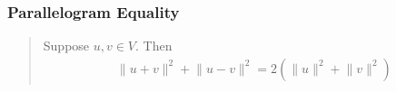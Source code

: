 \documentclass[letterpaper]{article}
\begin{document}
\subsubsection{Parallelogram Equality}
\label{sec:org3962bf4}
\begin{quote}
Suppose \(u, v \in V\). Then
\[\begin{aligned}
    \lVert u+v \rVert^2 + \lVert u-v \rVert^2 = 2(\lVert u \rVert^2 + \lVert v \rVert^2)
	\end{aligned}\]
\end{quote}
\end{document}
